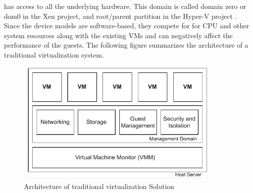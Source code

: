 has access to all the underlying hardware. This domain is called domain zero or dom0 in the Xen project,
and root/parent partition in the Hyper-V project \cite{nitro_whitepaper}. Since the device models are 
software-based, they compete for for CPU and other system resources along with the existing VMs and 
can negatively affect the performance of the guests. 
The following figure summarizes the architecture of a traditional virtualization system. 
\begin{figure}[H]
  \centering
  \includegraphics[width=10cm, height=6cm]{figures/traditional_hypervisor.pdf}
  \caption{Architecture of traditional virtualization Solution}
  \label{fig:hyper}
\end{figure}

